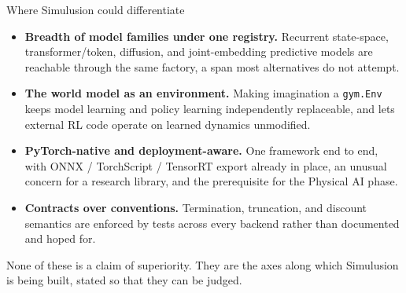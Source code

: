 \documentclass[10pt,a4paper]{article}
\newcommand{\sectionhead}[1]{\vspace{1mm}{\large\displayfont\color{ink} #1}\par\vspace{2mm}}
\newcommand{\subhead}[1]{{\displayfont\color{ink} #1}\par\vspace{1mm}}
\begin{document}
\vspace{4mm}
\begin{callout}
{\footnotesize
\subhead{Where Simulusion could differentiate}
\begin{itemize}
  \item \textbf{Breadth of model families under one registry.} Recurrent state-space, transformer/token, diffusion, and joint-embedding predictive models are reachable through the same factory, a span most alternatives do not attempt.
  \item \textbf{The world model as an environment.} Making imagination a \texttt{gym.Env} keeps model learning and policy learning independently replaceable, and lets external RL code operate on learned dynamics unmodified.
  \item \textbf{PyTorch-native and deployment-aware.} One framework end to end, with ONNX / TorchScript / TensorRT export already in place, an unusual concern for a research library, and the prerequisite for the Physical AI phase.
  \item \textbf{Contracts over conventions.} Termination, truncation, and discount semantics are enforced by tests across every backend rather than documented and hoped for.
\end{itemize}
\vspace{1mm}
None of these is a claim of superiority. They are the axes along which Simulusion is being built, stated so that they can be judged.}
\end{callout}

\vspace{4mm}
\sectionhead{References}
\end{document}

